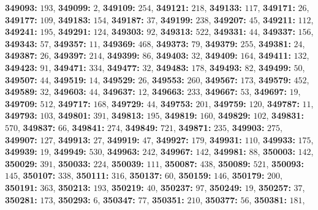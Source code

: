 \textsf{\bfseries 349093:} $193$, \textsf{\bfseries 349099:} $2$, \textsf{\bfseries 349109:} $254$, \textsf{\bfseries 349121:} $218$, \textsf{\bfseries 349133:} $117$, \textsf{\bfseries 349171:} $26$, \textsf{\bfseries 349177:} $109$, \textsf{\bfseries 349183:} $154$, \textsf{\bfseries 349187:} $37$, \textsf{\bfseries 349199:} $238$, \textsf{\bfseries 349207:} $45$, \textsf{\bfseries 349211:} $112$, \textsf{\bfseries 349241:} $195$, \textsf{\bfseries 349291:} $124$, \textsf{\bfseries 349303:} $92$, \textsf{\bfseries 349313:} $522$, \textsf{\bfseries 349331:} $44$, \textsf{\bfseries 349337:} $156$, \textsf{\bfseries 349343:} $57$, \textsf{\bfseries 349357:} $11$, \textsf{\bfseries 349369:} $468$, \textsf{\bfseries 349373:} $79$, \textsf{\bfseries 349379:} $255$, \textsf{\bfseries 349381:} $24$, \textsf{\bfseries 349387:} $26$, \textsf{\bfseries 349397:} $214$, \textsf{\bfseries 349399:} $86$, \textsf{\bfseries 349403:} $32$, \textsf{\bfseries 349409:} $164$, \textsf{\bfseries 349411:} $132$, \textsf{\bfseries 349423:} $91$, \textsf{\bfseries 349471:} $334$, \textsf{\bfseries 349477:} $32$, \textsf{\bfseries 349483:} $178$, \textsf{\bfseries 349493:} $82$, \textsf{\bfseries 349499:} $50$, \textsf{\bfseries 349507:} $44$, \textsf{\bfseries 349519:} $14$, \textsf{\bfseries 349529:} $26$, \textsf{\bfseries 349553:} $260$, \textsf{\bfseries 349567:} $173$, \textsf{\bfseries 349579:} $452$, \textsf{\bfseries 349589:} $32$, \textsf{\bfseries 349603:} $44$, \textsf{\bfseries 349637:} $12$, \textsf{\bfseries 349663:} $233$, \textsf{\bfseries 349667:} $53$, \textsf{\bfseries 349697:} $19$, \textsf{\bfseries 349709:} $512$, \textsf{\bfseries 349717:} $168$, \textsf{\bfseries 349729:} $44$, \textsf{\bfseries 349753:} $201$, \textsf{\bfseries 349759:} $120$, \textsf{\bfseries 349787:} $11$, \textsf{\bfseries 349793:} $103$, \textsf{\bfseries 349801:} $391$, \textsf{\bfseries 349813:} $195$, \textsf{\bfseries 349819:} $160$, \textsf{\bfseries 349829:} $102$, \textsf{\bfseries 349831:} $570$, \textsf{\bfseries 349837:} $66$, \textsf{\bfseries 349841:} $274$, \textsf{\bfseries 349849:} $721$, \textsf{\bfseries 349871:} $235$, \textsf{\bfseries 349903:} $275$, \textsf{\bfseries 349907:} $127$, \textsf{\bfseries 349913:} $27$, \textsf{\bfseries 349919:} $47$, \textsf{\bfseries 349927:} $179$, \textsf{\bfseries 349931:} $110$, \textsf{\bfseries 349933:} $175$, \textsf{\bfseries 349939:} $19$, \textsf{\bfseries 349949:} $530$, \textsf{\bfseries 349963:} $242$, \textsf{\bfseries 349967:} $142$, \textsf{\bfseries 349981:} $88$, \textsf{\bfseries 350003:} $142$, \textsf{\bfseries 350029:} $391$, \textsf{\bfseries 350033:} $224$, \textsf{\bfseries 350039:} $111$, \textsf{\bfseries 350087:} $438$, \textsf{\bfseries 350089:} $521$, \textsf{\bfseries 350093:} $145$, \textsf{\bfseries 350107:} $338$, \textsf{\bfseries 350111:} $316$, \textsf{\bfseries 350137:} $60$, \textsf{\bfseries 350159:} $146$, \textsf{\bfseries 350179:} $200$, \textsf{\bfseries 350191:} $363$, \textsf{\bfseries 350213:} $193$, \textsf{\bfseries 350219:} $40$, \textsf{\bfseries 350237:} $97$, \textsf{\bfseries 350249:} $19$, \textsf{\bfseries 350257:} $37$, \textsf{\bfseries 350281:} $173$, \textsf{\bfseries 350293:} $6$, \textsf{\bfseries 350347:} $77$, \textsf{\bfseries 350351:} $210$, \textsf{\bfseries 350377:} $56$, \textsf{\bfseries 350381:} $181$, 
